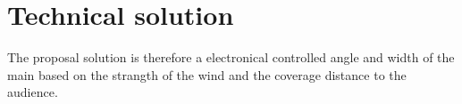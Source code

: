 \section{Technical solution}

The proposal solution is therefore a electronical controlled angle and width of the main based on the strangth of the wind and the coverage distance to the audience. 
